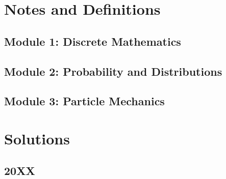\documentclass{solutionsmannual}
\begin{document}
\part{Notes and Definitions}
\chapter{Module 1: Discrete Mathematics}

\chapter{Module 2: Probability and Distributions}

\chapter{Module 3: Particle Mechanics}


\part{Solutions}

\chapter{20XX}

\eModule
{}
\eModule
{}
\eModule

\end{document}
